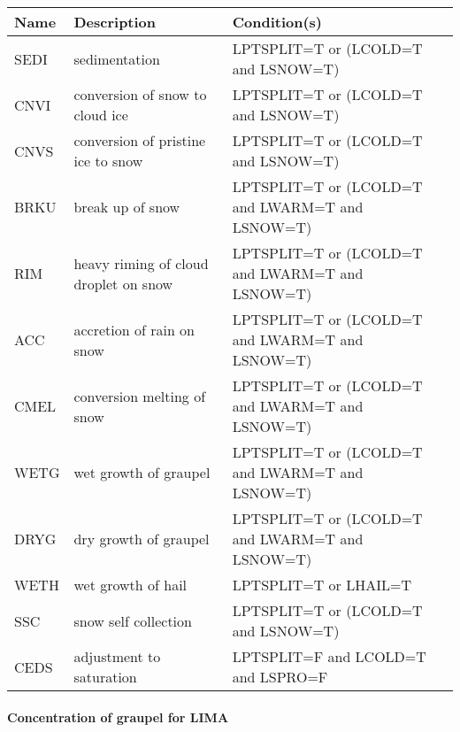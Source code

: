 \begin{longtable} {|p{}|p{}|p{}|}
\hline
Name & Description & Condition(s) \\
\hline \hline
\endhead
SEDI   & sedimentation                                  & LPTSPLIT=T or (LCOLD=T and LSNOW=T) \\\hline
CNVI   & conversion of snow to cloud ice                & LPTSPLIT=T or (LCOLD=T and LSNOW=T) \\\hline
CNVS   & conversion of pristine ice to snow             & LPTSPLIT=T or (LCOLD=T and LSNOW=T) \\\hline
BRKU   & break up of snow                               & LPTSPLIT=T or (LCOLD=T and LWARM=T and LSNOW=T) \\\hline
RIM    & heavy riming of cloud droplet on snow          & LPTSPLIT=T or (LCOLD=T and LWARM=T and LSNOW=T) \\\hline
ACC    & accretion of rain on snow                      & LPTSPLIT=T or (LCOLD=T and LWARM=T and LSNOW=T) \\\hline
CMEL   & conversion melting of snow                     & LPTSPLIT=T or (LCOLD=T and LWARM=T and LSNOW=T) \\\hline
WETG   & wet growth of graupel                          & LPTSPLIT=T or (LCOLD=T and LWARM=T and LSNOW=T) \\\hline
DRYG   & dry growth of graupel                          & LPTSPLIT=T or (LCOLD=T and LWARM=T and LSNOW=T) \\\hline
WETH   & wet growth of hail                             & LPTSPLIT=T or LHAIL=T \\\hline
SSC    & snow self collection                           & LPTSPLIT=T or (LCOLD=T and LSNOW=T) \\\hline
CEDS   & adjustment to saturation                       & LPTSPLIT=F and LCOLD=T and LSPRO=F \\\hline
\end{longtable}

\paragraph{Concentration of graupel for LIMA}
\mbox{} %

